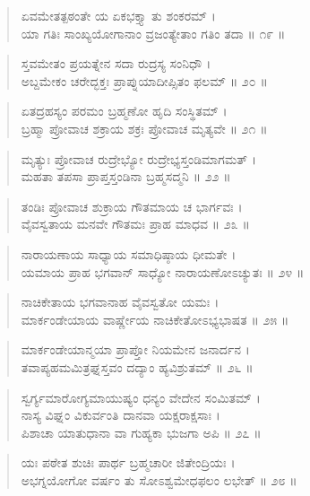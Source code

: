 \begin{verse}
ಏವಮೇತತ್ಪಠಂತೇ ಯ ಏಕಭಕ್ತ್ಯಾ ತು ಶಂಕರಮ್ ।\\ಯಾ ಗತಿಃ ಸಾಂಖ್ಯಯೋಗಾನಾಂ ವ್ರಜಂತ್ಯೇತಾಂ ಗತಿಂ ತದಾ \num{॥ ೧೯ ॥}
\end{verse}

\begin{verse}
ಸ್ತವಮೇತಂ ಪ್ರಯತ್ನೇನ ಸದಾ ರುದ್ರಸ್ಯ ಸಂನಿಧೌ ।\\ಅಬ್ದಮೇಕಂ ಚರೇದ್ಭಕ್ತಃ ಪ್ರಾಪ್ನುಯಾದೀಪ್ಸಿತಂ ಫಲಮ್ \num{॥ ೨೦ ॥}
\end{verse}

\begin{verse}
ಏತದ್ರಹಸ್ಯಂ ಪರಮಂ ಬ್ರಹ್ಮಣೋ ಹೃದಿ ಸಂಸ್ಥಿತಮ್ ।\\ಬ್ರಹ್ಮಾ ಪ್ರೋವಾಚ ಶಕ್ರಾಯ ಶಕ್ರಃ ಪ್ರೋವಾಚ ಮೃತ್ಯವೇ \num{॥ ೨೧ ॥}
\end{verse}

\begin{verse}
ಮೃತ್ಯುಃ ಪ್ರೋವಾಚ ರುದ್ರೇಭ್ಯೋ ರುದ್ರೇಭ್ಯಸ್ತಂಡಿಮಾಗಮತ್ ।\\ಮಹತಾ ತಪಸಾ ಪ್ರಾಪ್ತಸ್ತಂಡಿನಾ ಬ್ರಹ್ಮಸದ್ಮನಿ \num{॥ ೨೨ ॥}
\end{verse}

\begin{verse}
ತಂಡಿಃ ಪ್ರೋವಾಚ ಶುಕ್ರಾಯ ಗೌತಮಾಯ ಚ ಭಾರ್ಗವಃ ।\\ವೈವಸ್ವತಾಯ ಮನವೇ ಗೌತಮಃ ಪ್ರಾಹ ಮಾಧವ \num{॥ ೨೩ ॥}
\end{verse}

\begin{verse}
ನಾರಾಯಣಾಯ ಸಾಧ್ಯಾಯ ಸಮಾಧಿಷ್ಠಾಯ ಧೀಮತೇ ।\\ಯಮಾಯ ಪ್ರಾಹ ಭಗವಾನ್ ಸಾಧ್ಯೋ ನಾರಾಯಣೋಽಚ್ಯುತಃ \num{॥ ೨೪ ॥}
\end{verse}

\begin{verse}
ನಾಚಿಕೇತಾಯ ಭಗವಾನಾಹ ವೈವಸ್ವತೋ ಯಮಃ ।\\ಮಾರ್ಕಂಡೇಯಾಯ ವಾರ್ಷ್ಣೇಯ ನಾಚಿಕೇತೋಽಭ್ಯಭಾಷತ \num{॥ ೨೫ ॥}
\end{verse}

\begin{verse}
ಮಾರ್ಕಂಡೇಯಾನ್ಮಯಾ ಪ್ರಾಪ್ತೋ ನಿಯಮೇನ ಜನಾರ್ದನ ।\\ತವಾಪ್ಯಹಮಮಿತ್ರಘ್ನಸ್ತವಂ ದದ್ಯಾಂ ಹ್ಯವಿಶ್ರುತಮ್ \num{॥ ೨೬ ॥}
\end{verse}

\begin{verse}
ಸ್ವರ್ಗ್ಯಮಾರೋಗ್ಯಮಾಯುಷ್ಯಂ ಧನ್ಯಂ ವೇದೇನ ಸಂಮಿತಮ್ ।\\ನಾಸ್ಯ ವಿಘ್ನಂ ವಿಕುರ್ವಂತಿ ದಾನವಾ ಯಕ್ಷರಾಕ್ಷಸಾಃ ।\\ಪಿಶಾಚಾ ಯಾತುಧಾನಾ ವಾ ಗುಹ್ಯಕಾ ಭುಜಗಾ ಅಪಿ \num{॥ ೨೭ ॥}
\end{verse}

\begin{verse}
ಯಃ ಪಠೇತ ಶುಚಿಃ ಪಾರ್ಥ ಬ್ರಹ್ಮಚಾರೀ ಜಿತೇಂದ್ರಿಯಃ ।\\ಅಭಗ್ನಯೋಗೋ ವರ್ಷಂ ತು ಸೋಽಶ್ವಮೇಧಫಲಂ ಲಭೇತ್ \num{॥ ೨೮ ॥}
\end{verse}

